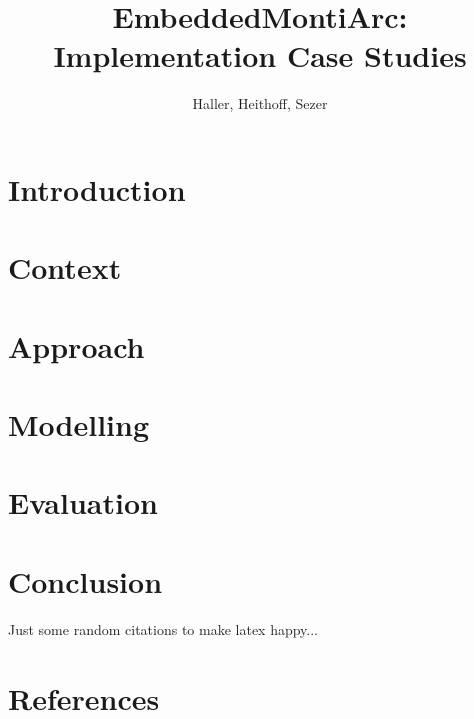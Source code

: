 \documentclass[review]{elsarticle}
\begin{document}
\begin{frontmatter}

\title{EmbeddedMontiArc: Implementation Case Studies}

\author{Haller, Heithoff, Sezer}
\address{RWTH Aachen}


\begin{abstract}


\end{abstract}

\begin{keyword}

\end{keyword}

\end{frontmatter}

\linenumbers

\section{Introduction}


\section{Context}


\section{Approach}


\section{Modelling}


\section{Evaluation}


\section{Conclusion}



Just some random citations to make latex happy...
\cite{Feynman1963118,Dirac1953888}


\section*{References}


\end{document}
